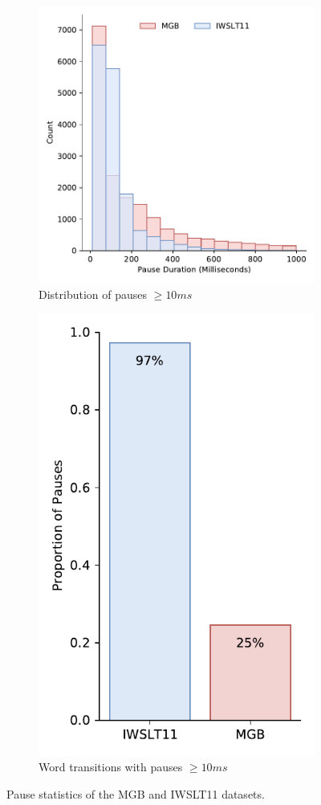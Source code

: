 \documentclass[bsc,deptreport,ai]{infthesis} %
\begin{document}
\begin{figure}
\centering
\begin{subfigure}{.49\textwidth}
\centering
\includegraphics[height=.95\textwidth]{pausedist.pdf}
\caption{Distribution of pauses $\geq 10ms$}%
\end{subfigure}
\begin{subfigure}{.49\textwidth}
\centering
\includegraphics[height=.915\textwidth]{pauseprop.pdf}
\vspace{.2cm}
\caption{Word transitions with  pauses $\geq 10ms$}%
\end{subfigure}
\caption{Pause statistics of the MGB and IWSLT11 datasets.}
\label{fig:exppausedecay}
\end{figure}
\end{document}
